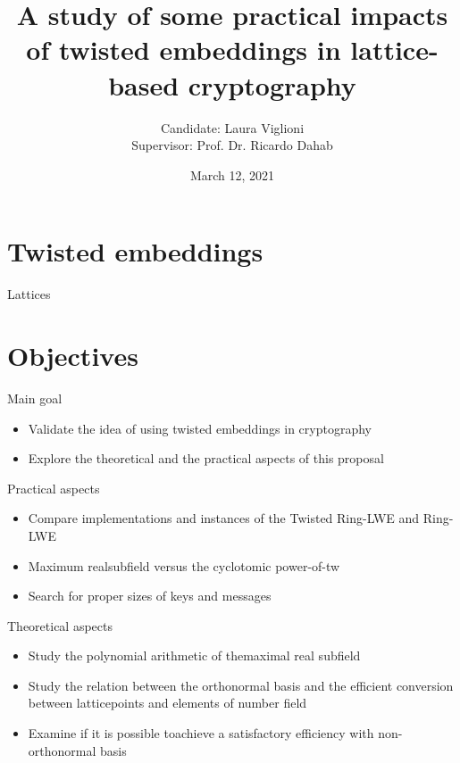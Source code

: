 \documentclass[notheorems, bigger]{beamer}
\author{Candidate: Laura Viglioni \\ Supervisor: Prof. Dr. Ricardo Dahab}
\date{March 12, 2021}
\title{A study of some practical impacts of twisted embeddings in lattice-based cryptography}
\begin{document}
\maketitle

\section{Twisted embeddings}
\label{sec:org41924c3}
\begin{frame}[label={sec:orge3b9d7d}]{Lattices}
\end{frame}
\section{Objectives}
\label{sec:org0d83388}
\begin{frame}[label={sec:orge9256ec}]{Main goal}
\begin{itemize}
\item Validate the idea of using twisted embeddings in cryptography
\item Explore the theoretical and the practical aspects of this proposal
\end{itemize}
\end{frame}
\begin{frame}[label={sec:org969b9b2}]{Practical aspects}
\begin{itemize}
\item Compare implementations and instances of the Twisted Ring-LWE and Ring-LWE
\item Maximum realsubfield versus the cyclotomic power-of-tw
\item Search for proper sizes of keys and messages
\end{itemize}
\end{frame}
\begin{frame}[label={sec:orgf5fcd15}]{Theoretical aspects}
\begin{itemize}
\item Study the polynomial arithmetic of themaximal real subfield
\item Study the relation between the orthonormal basis and the efficient conversion between latticepoints and elements of number field
\item Examine if it is possible toachieve a satisfactory efficiency with non-orthonormal basis
\end{itemize}
\end{frame}
\end{document}
